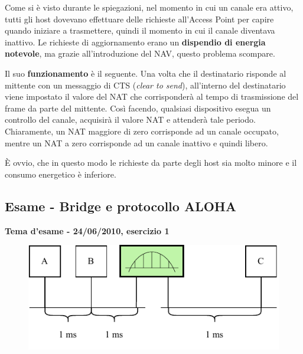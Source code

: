 \documentclass[a4paper]{article}
\begin{document}
	Come si è visto durante le spiegazioni, nel momento in cui un canale era attivo, tutti gli host dovevano effettuare delle richieste all'Access Point per capire quando iniziare a trasmettere, quindi il momento in cui il canale diventava inattivo. Le richieste di aggiornamento erano un \textbf{dispendio di energia notevole}, ma grazie all'introduzione del NAV, questo problema scompare.
	
	Il suo \textbf{funzionamento} è il seguente. Una volta che il destinatario risponde al mittente con un messaggio di CTS (\emph{clear to send}), all'interno del destinatario viene impostato il valore del NAT che corrisponderà al tempo di trasmissione del frame da parte del mittente. Così facendo, qualsiasi dispositivo esegua un controllo del canale, acquisirà il valore NAT e attenderà tale periodo. Chiaramente, un NAT maggiore di zero corrisponde ad un canale occupato, mentre un NAT a zero corrisponde ad un canale inattivo e quindi libero.
	
	È ovvio, che in questo modo le richieste da parte degli host sia molto minore e il consumo energetico è inferiore.
	\newpage

	\subsection{\textcolor{Red3}{Esame - Bridge e protocollo ALOHA}}
	
	\begin{center}
		\large
		\textcolor{Green4}{\textbf{Tema d'esame - 24/06/2010, esercizio 1}}
	\end{center}
	\begin{figure}[!htp]
		\centering
		\includegraphics[width=.7\textwidth]{img/ex2_bridge-ALOHA.pdf}
	\end{figure}
\end{document}
